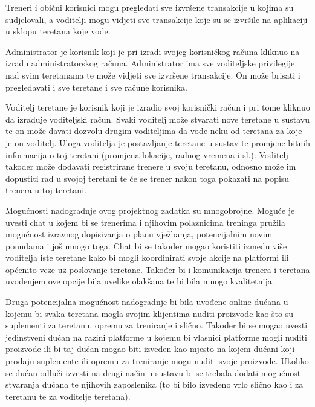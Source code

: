 		
		Treneri i obični korisnici mogu pregledati sve izvršene transakcije u kojima su sudjelovali, a voditelji mogu
		vidjeti sve transakcije koje su se izvršile na aplikaciji u sklopu teretana koje vode.
		
		Administrator je korisnik koji je pri izradi svojeg korisničkog računa kliknuo na izradu administratorskog
		računa. Administrator ima sve voditeljske privilegije nad svim teretanama te može vidjeti sve izvršene
		transakcije. On može brisati i pregledavati i sve teretane i sve račune korisnika.
		
		Voditelj teretane je korisnik koji je izradio svoj korisnički račun i pri tome kliknuo da izrađuje voditeljski račun.
		Svaki voditelj može stvarati nove teretane u sustavu te on može davati dozvolu drugim voditeljima da vode
		neku od teretana za koje je on voditelj. Uloga voditelja je postavljanje teretane u sustav te promjene bitnih
		informacija o toj teretani (promjena lokacije, radnog vremena i sl.). Voditelj također može dodavati
		registrirane trenere u svoju teretanu, odnosno može im dopustiti rad u svojoj teretani te će se trener nakon
		toga pokazati na popisu trenera u toj teretani.
		
	
	
		\vspace{5mm}
		
		Mogućnosti nadogradnje ovog projektnog zadatka su mnogobrojne. Moguće je uvesti chat u kojem bi se trenerima i njihovim polaznicima treninga pružila mogućnost izravnog dopisivanja o planu vježbanja, potencijalnim novim ponudama i 
		još mnogo toga. Chat bi se također mogao koristiti između više voditelja iste teretane kako bi mogli koordinirati svoje akcije na platformi ili općenito veze uz poslovanje teretane. Također bi i komunikacija trenera i teretana uvođenjem ove 
		opcije bila uvelike olakšana te bi bila mnogo kvalitetnija. 
		
		Druga potencijalna mogućnost nadogradnje bi bila uvođene online dućana u kojemu 
		bi svaka teretana mogla svojim klijentima nuditi proizvode kao što su suplementi za 
		teretanu, opremu za treniranje i slično. Također bi se mogao uvesti jedinstveni 
		dućan na razini platforme u kojemu bi vlasnici platforme mogli nuditi proizvode ili bi 
		taj dućan mogao biti izveden kao mjesto na kojem dućani koji prodaju suplemente ili 
		opremu za treniranje mogu nuditi svoje proizvode. Ukoliko se dućan odluči izvesti na 
		drugi način u sustavu bi se trebala dodati mogućnost stvaranja dućana te njihovih 
		zaposlenika (to bi bilo izvedeno vrlo slično kao i za teretanu te za voditelje teretana).
		
